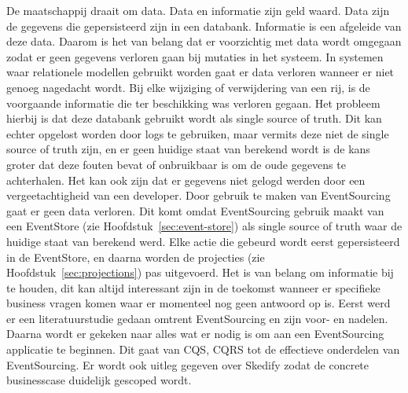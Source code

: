 De maatschappij draait om data. Data en informatie zijn geld waard. Data zijn de gegevens die gepersisteerd zijn in een databank. Informatie is een afgeleide van deze data. Daarom is het van belang dat er voorzichtig met data wordt omgegaan zodat er geen gegevens verloren gaan bij mutaties in het systeem. In systemen waar relationele modellen gebruikt worden gaat er data verloren wanneer er niet genoeg nagedacht wordt. Bij elke wijziging of verwijdering van een rij, is de voorgaande informatie die ter beschikking was verloren gegaan. Het probleem hierbij is dat deze databank gebruikt wordt als single source of truth. Dit kan echter opgelost worden door logs te gebruiken, maar vermits deze niet de single source of truth zijn, en er geen huidige staat van berekend wordt is de kans groter dat deze fouten bevat of onbruikbaar is om de oude gegevens te achterhalen. Het kan ook zijn dat er gegevens niet gelogd werden door een vergeetachtigheid van een developer. Door gebruik te maken van EventSourcing gaat er geen data verloren. Dit komt omdat EventSourcing gebruik maakt van een EventStore (zie Hoofdstuk~\ref{sec:event-store}) als single source of truth waar de huidige staat van berekend werd. Elke actie die gebeurd wordt eerst gepersisteerd in de EventStore, en daarna worden de projecties (zie Hoofdstuk~\ref{sec:projections}) pas uitgevoerd.
Het is van belang om informatie bij te houden, dit kan altijd interessant zijn in de toekomst wanneer er specifieke business vragen komen waar er momenteel nog geen antwoord op is.
Eerst werd er een literatuurstudie gedaan omtrent EventSourcing en zijn voor- en nadelen.
Daarna wordt er gekeken naar alles wat er nodig is om aan een EventSourcing applicatie te beginnen. Dit gaat van \gls{CQS}, \gls{CQRS} tot de effectieve onderdelen van EventSourcing. Er wordt ook uitleg gegeven over Skedify zodat de concrete businesscase duidelijk gescoped wordt.
